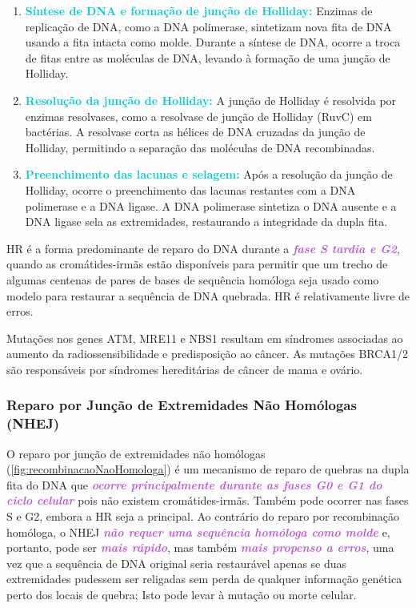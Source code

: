 \documentclass[11pt,a4paper]{article}
\begin{document}
\begin{enumerate}[label=\textcolor{CarnationPink}{\arabic*${}^\circ $}]
		\item \textcolor{DarkTurquoise}{\textbf{Síntese de DNA e formação de junção de Holliday:}} Enzimas de replicação de DNA, como a DNA polimerase, sintetizam nova fita de DNA usando a fita intacta como molde. Durante a síntese de DNA, ocorre a troca de fitas entre as moléculas de DNA, levando à formação de uma junção de Holliday.
		\item \textcolor{DarkTurquoise}{\textbf{Resolução da junção de Holliday:}} A junção de Holliday é resolvida por enzimas resolvases, como a resolvase de junção de Holliday (RuvC) em bactérias. A resolvase corta as hélices de DNA cruzadas da junção de Holliday, permitindo a separação das moléculas de DNA recombinadas.
		\item \textcolor{DarkTurquoise}{\textbf{Preenchimento das lacunas e selagem:}} Após a resolução da junção de Holliday, ocorre o preenchimento das lacunas restantes com a DNA polimerase e a DNA ligase. A DNA polimerase sintetiza o DNA ausente e a DNA ligase sela as extremidades, restaurando a integridade da dupla fita.
	\end{enumerate}

	HR é a forma predominante de reparo do DNA durante a \textcolor{MediumOrchid}{\textbf{\textit{fase S tardia e G2}}}, quando as cromátides-irmãs estão disponíveis para permitir que um trecho de algumas centenas de pares de bases de sequência homóloga seja usado como modelo para restaurar a sequência de DNA quebrada. HR é relativamente livre de erros. 
	
	Mutações nos genes ATM, MRE11 e NBS1 resultam em síndromes associadas ao aumento da radiossensibilidade e predisposição ao câncer. As mutações BRCA1/2 são responsáveis por síndromes hereditárias de câncer de mama e ovário.

\subsubsection*{Reparo por Junção de Extremidades Não Homólogas (NHEJ)}

	O reparo por junção de extremidades não homólogas (\ref{fig:recombinacaoNaoHomologa}) é um mecanismo de reparo de quebras na dupla fita do DNA que \textcolor{MediumOrchid}{\textbf{\textit{ocorre principalmente durante as fases G0 e G1 do ciclo celular}}} pois não existem cromátides-irmãs. Também pode ocorrer nas fases S e G2, embora a HR seja a principal. Ao contrário do reparo por recombinação homóloga, o NHEJ \textcolor{MediumOrchid}{\textbf{\textit{não requer uma sequência homóloga como molde}}} e, portanto, pode ser \textcolor{MediumOrchid}{\textbf{\textit{mais rápido}}}, mas também \textcolor{MediumOrchid}{\textbf{\textit{mais propenso a erros}}}, uma vez que a sequência de DNA original seria restaurável apenas se duas extremidades pudessem ser religadas sem perda de qualquer informação genética perto dos locais de quebra; Isto pode levar à mutação ou morte celular.
	
\end{document}
